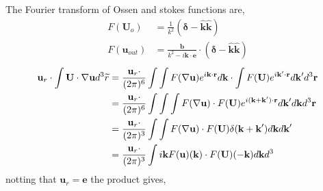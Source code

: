 The Fourier transform of Ossen and stokes functions are,
\begin{align*}
    F(\textbf{U}_o) &= \frac{1}{k^2}\left(\bm\delta - \hat{\textbf{k}}\hat{\textbf{k}}\right)\\
    F(\textbf{u}_{out})
    &= \frac{\textbf{b}}{k^2 - i\textbf{k}\cdot \textbf{e}}\cdot \left(\bm\delta - \hat{\textbf{k}}\hat{\textbf{k}}\right)
\end{align*}
\begin{align*}
    \textbf{u}_r\cdot \int \textbf{U}\cdot \mathbf{\nabla} \textbf{u} d^3 \widetilde{r}
    &=
    \frac{\textbf{u}_r\cdot }{(2\pi)^6}\int \int  F(\mathbf{\nabla} \textbf{u}) e^{i\textbf{k}\cdot \textbf{r}} d\textbf{k}
    \cdot \int F(\textbf{U}) e^{i\textbf{k}'\cdot \textbf{r}} d\textbf{k}'  d^3 \textbf{r}\\
    &=
    \frac{\textbf{u}_r\cdot }{(2\pi)^6}\int \int \int   F(\mathbf{\nabla} \textbf{u})
    \cdot F(\textbf{U}) e^{i(\textbf{k}+ \textbf{k}')\cdot \textbf{r}} d\textbf{k}' d\textbf{k}  d^3 \textbf{r}\\
    &=
    \frac{\textbf{u}_r\cdot }{(2\pi)^3} \int \int   F(\mathbf{\nabla} \textbf{u})
    \cdot F(\textbf{U})  \delta(\textbf{k}+ \textbf{k}') d\textbf{k}   d\textbf{k}' \\
    &=
    \frac{\textbf{u}_r\cdot }{(2\pi)^3} \int  i \textbf{k}F( \textbf{u})(\textbf{k})
    \cdot F(\textbf{U})(-\textbf{k}) d\textbf{k}  d^3 \\
\end{align*}
notting that $\textbf{u}_r= \textbf{e}$ the product gives,
